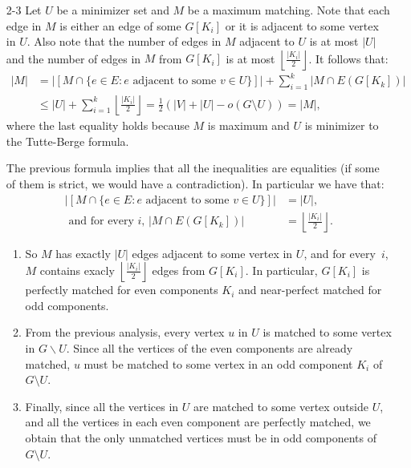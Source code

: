 \documentclass[12pt]{article}
\begin{document}
\begin{enumerate}
{\bf Observation:} We do not present an efficient algorithm
to find a desired maximum matching $M^{*}$ from $M$.
The statement of the problem does not ask for one.
\item[2-3] %
Let $U$ be a minimizer set and $M$ be a maximum
matching. Note that each edge in $M$ is either an edge of some
$G[K_i]$ or it is adjacent to some vertex in $U$. Also note that the
number of edges in $M$ adjacent to $U$ is at most $|U|$ and the number
of edges in $M$ from $G[K_i]$ is at most
$\left\lfloor\frac{|K_i|}{2}\right\rfloor$. It follows that:
\begin{align*}
|M| &= \left|\left[M \cap \{e \in E: e \text{ adjacent to some $v \in U$}\}\right]\right| +  \sum_{i=1}^k |M \cap E(G[K_k])|\\
&\leq |U| + \sum_{i=1}^k \left\lfloor\frac{|K_i|}{2}\right\rfloor = \frac{1}{2}(|V| + |U| - o(G\setminus U)) = |M|,
\end{align*}
where the last equality holds because $M$ is maximum and $U$ is
minimizer to the Tutte-Berge formula.

The previous formula implies that all the inequalities are equalities
(if some of them is strict, we would have a contradiction). In
particular we have that:
\begin{align*}
\left|\left[M \cap \{e \in E: e \text{ adjacent to some $v \in
U$}\}\right]\right| &= |U|, \\ \text{ and for every $i$, } |M \cap
E(G[K_k])| &= \left\lfloor\frac{|K_i|}{2}\right\rfloor .
\end{align*}

\begin{enumerate}
\item So $M$ has exactly $|U|$ edges adjacent to some vertex in
$U$, and for every~$i$, $M$ contains exacly
$\left\lfloor\frac{|K_i|}{2}\right\rfloor$ edges from $G[K_i]$. In
particular, $G[K_i]$ is perfectly matched for even components $K_i$
and near-perfect matched for odd components.

\item From the previous analysis, every vertex $u$ in $U$ is
matched to some vertex in $G \backslash U$. Since all the vertices of the even
components are already matched, $u$ must be matched to some vertex in
an odd component $K_i$ of $G\setminus U$.

\item Finally, since all the vertices in $U$ are matched to some vertex
outside $U$, and all the vertices in each even component are perfectly
matched, we obtain that the only unmatched vertices must be in odd
components of $G\setminus U$.
\end{enumerate}


\end{enumerate}
\end{document}
